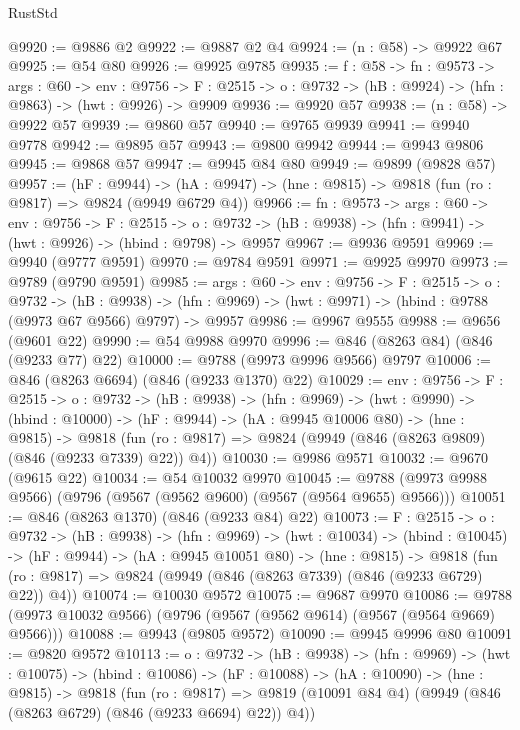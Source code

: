 \begin{lexlean}{RustStd}
\begin{coremodule}
@9920 := @9886 @2
@9922 := @9887 @2 @4
@9924 := (n : @58) -> @9922 @67
@9925 := @54 @80
@9926 := @9925 @9785
@9935 := {f : @58} ->
  {fn : @9573} ->
  {args : @60} ->
  {env : @9756} ->
  {F : @2515} -> {o : @9732} -> (hB : @9924) -> (hfn : @9863) -> (hwt : @9926) -> @9909
@9936 := @9920 @57
@9938 := (n : @58) -> @9922 @57
@9939 := @9860 @57
@9940 := @9765 @9939
@9941 := @9940 @9778
@9942 := @9895 @57
@9943 := @9800 @9942
@9944 := @9943 @9806
@9945 := @9868 @57
@9947 := @9945 @84 @80
@9949 := @9899 (@9828 @57)
@9957 := (hF : @9944) ->
  (hA : @9947) -> (hne : @9815) -> @9818 (fun (ro : @9817) => @9824 (@9949 @6729 @4))
@9966 := {fn : @9573} ->
  {args : @60} ->
  {env : @9756} ->
  {F : @2515} ->
  {o : @9732} -> (hB : @9938) -> (hfn : @9941) -> (hwt : @9926) -> (hbind : @9798) -> @9957
@9967 := @9936 @9591
@9969 := @9940 (@9777 @9591)
@9970 := @9784 @9591
@9971 := @9925 @9970
@9973 := @9789 (@9790 @9591)
@9985 := {args : @60} ->
  {env : @9756} ->
  {F : @2515} ->
  {o : @9732} ->
  (hB : @9938) -> (hfn : @9969) -> (hwt : @9971) -> (hbind : @9788 (@9973 @67 @9566) @9797) -> @9957
@9986 := @9967 @9555
@9988 := @9656 (@9601 @22)
@9990 := @54 @9988 @9970
@9996 := @846 (@8263 @84) (@846 (@9233 @77) @22)
@10000 := @9788 (@9973 @9996 @9566) @9797
@10006 := @846 (@8263 @6694) (@846 (@9233 @1370) @22)
@10029 := {env : @9756} ->
  {F : @2515} ->
  {o : @9732} ->
  (hB : @9938) ->
  (hfn : @9969) ->
  (hwt : @9990) ->
  (hbind : @10000) ->
  (hF : @9944) ->
  (hA : @9945 @10006 @80) ->
  (hne : @9815) ->
  @9818 (fun (ro : @9817) => @9824 (@9949 (@846 (@8263 @9809) (@846 (@9233 @7339) @22)) @4))
@10030 := @9986 @9571
@10032 := @9670 (@9615 @22)
@10034 := @54 @10032 @9970
@10045 := @9788 (@9973 @9988 @9566) (@9796 (@9567 (@9562 @9600) (@9567 (@9564 @9655) @9566)))
@10051 := @846 (@8263 @1370) (@846 (@9233 @84) @22)
@10073 := {F : @2515} ->
  {o : @9732} ->
  (hB : @9938) ->
  (hfn : @9969) ->
  (hwt : @10034) ->
  (hbind : @10045) ->
  (hF : @9944) ->
  (hA : @9945 @10051 @80) ->
  (hne : @9815) ->
  @9818 (fun (ro : @9817) => @9824 (@9949 (@846 (@8263 @7339) (@846 (@9233 @6729) @22)) @4))
@10074 := @10030 @9572
@10075 := @9687 @9970
@10086 := @9788 (@9973 @10032 @9566) (@9796 (@9567 (@9562 @9614) (@9567 (@9564 @9669) @9566)))
@10088 := @9943 (@9805 @9572)
@10090 := @9945 @9996 @80
@10091 := @9820 @9572
@10113 := {o : @9732} ->
  (hB : @9938) ->
  (hfn : @9969) ->
  (hwt : @10075) ->
  (hbind : @10086) ->
  (hF : @10088) ->
  (hA : @10090) ->
  (hne : @9815) ->
  @9818
    (fun (ro : @9817) =>
    @9819 (@10091 @84 @4) (@9949 (@846 (@8263 @6729) (@846 (@9233 @6694) @22)) @4))

\end{coremodule}
\end{lexlean}
